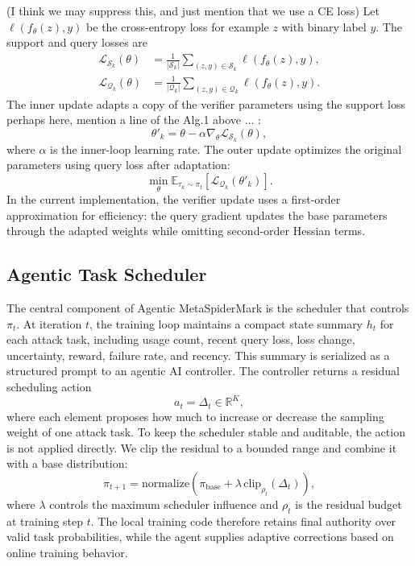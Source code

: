 {\color{blue} (I think we may suppress this, and just mention that we use a CE loss)}
Let $\ell(f_{\theta}(z), y)$ be the cross-entropy loss for example $z$ with binary label $y$.
The support and query losses are
\begin{equation}
\begin{aligned}
    \mathcal{L}_{\mathcal{S}_k}(\theta)
    &=
    \frac{1}{|\mathcal{S}_k|}
    \sum_{(z,y)\in\mathcal{S}_k}
    \ell(f_{\theta}(z), y), \\
    \mathcal{L}_{\mathcal{Q}_k}(\theta)
    &=
    \frac{1}{|\mathcal{Q}_k|}
    \sum_{(z,y)\in\mathcal{Q}_k}
    \ell(f_{\theta}(z), y).
\end{aligned}
\end{equation}
The inner update adapts a copy of the verifier parameters using the support loss {\color{blue} perhaps here, mention a line of the Alg.1 above ...  }:
\begin{equation}
    \theta'_k = \theta - \alpha \nabla_{\theta}
    \mathcal{L}_{\mathcal{S}_k}(\theta),
\end{equation}
where $\alpha$ is the inner-loop learning rate.
The outer update optimizes the original parameters using query loss after adaptation:
\begin{equation}
    \min_{\theta}
    \mathbb{E}_{\tau_k \sim \pi_t}
    \left[
    \mathcal{L}_{\mathcal{Q}_k}(\theta'_k)
    \right].
\end{equation}
In the current implementation, the verifier update uses a first-order approximation for efficiency: the query gradient updates the base parameters through the adapted weights while omitting second-order Hessian terms.

\subsection{Agentic Task Scheduler}

The central component of Agentic MetaSpiderMark is the scheduler that controls $\pi_t$.
At iteration $t$, the training loop maintains a compact state summary $h_t$ for each attack task, including usage count, recent query loss, loss change, uncertainty, reward, failure rate, and recency.
This summary is serialized as a structured prompt to an agentic AI controller.
The controller returns a residual scheduling action
\begin{equation}
    a_t = \Delta_t \in \mathbb{R}^{K},
\end{equation}
where each element proposes how much to increase or decrease the sampling weight of one attack task.
To keep the scheduler stable and auditable, the action is not applied directly.
We clip the residual to a bounded range and combine it with a base distribution:
\begin{equation}
    \pi_{t+1}
    =
    \mathrm{normalize}
    \left(
    \pi_{\mathrm{base}} + \lambda \, \mathrm{clip}_{\rho_t}(\Delta_t)
    \right),
\end{equation}
where $\lambda$ controls the maximum scheduler influence and $\rho_t$ is the residual budget at training step $t$.
The local training code therefore retains final authority over valid task probabilities, while the agent supplies adaptive corrections based on online training behavior.

